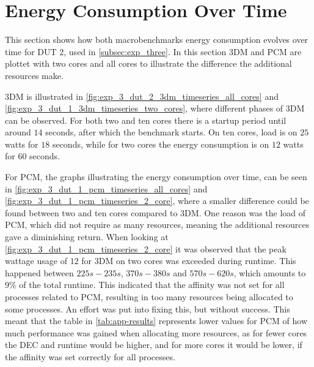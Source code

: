 \section{Energy Consumption Over Time}\label{app:timeseries}

This section shows how both macrobenchmarks energy consumption evolves over time for DUT 2, used in \cref{subsec:exp_three}. In this section 3DM and PCM are plottet with two cores and all cores to illustrate the difference the additional resources make. 

3DM is illustrated in \cref{fig:exp_3_dut_2_3dm_timeseries_all_cores} and \cref{fig:exp_3_dut_1_3dm_timeseries_two_cores}, where different phases of 3DM can be observed. For both two and ten cores there is a startup period until around $14$ seconds, after which the benchmark starts. On ten cores, load is on $25$ watts for $18$ seconds, while for two cores the energy consumption is on $12$ watts for $60$ seconds. 




For PCM, the graphs illustrating the energy consumption over time, can be seen in \cref{fig:exp_3_dut_1_pcm_timeseries_all_cores} and \cref{fig:exp_3_dut_1_pcm_timeseries_2_core}, where a smaller difference could be found between two and ten cores compared to 3DM. One reason was the load of PCM, which did not require as many resources, meaning the additional resources gave a diminishing return. When looking at \cref{fig:exp_3_dut_1_pcm_timeseries_2_core} it was observed that the peak wattage usage of $12$ for 3DM on two cores was exceeded during runtime. This happened between $225s-235s$, $370s-380s$ and $570s-620s$, which amounts to $9\%$ of the total runtime. This indicated that the affinity was not set for all processes related to PCM, resulting in too many resources being allocated to some processes. An effort was put into fixing this, but without success. This meant that the table in \cref{tab:app-results} represents lower values for PCM of how much performance was gained when allocating more resources, as for fewer cores the DEC and runtime would be higher, and for more cores it would be lower, if the affinity was set correctly for all processes.


